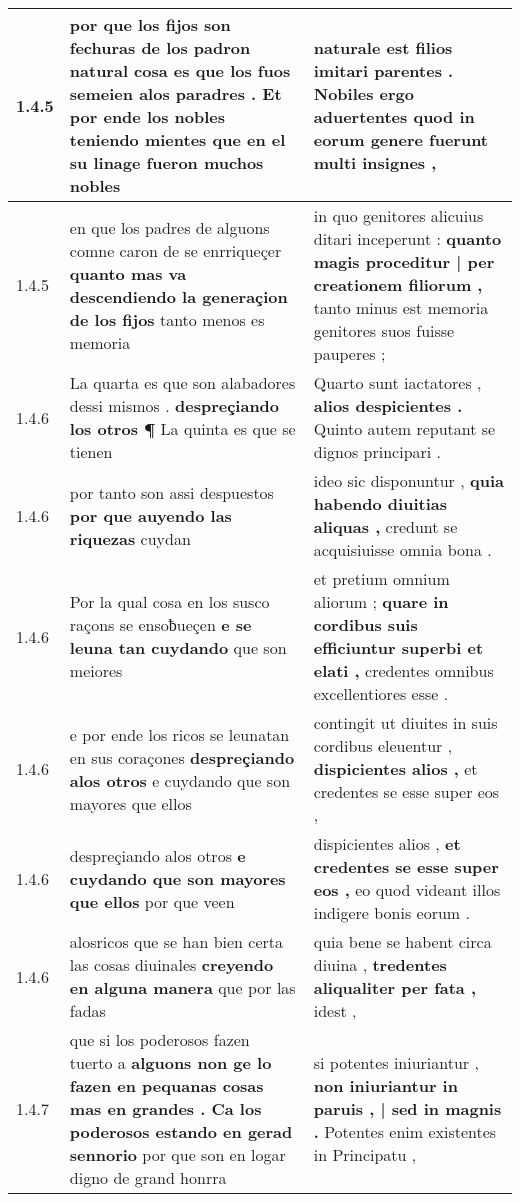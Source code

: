 \begin{tabular}{|p{1cm}|p{6.5cm}|p{6.5cm}|}
1.4.5 & por que los fijos son fechuras de los padron natural cosa es que los fuos semeien alos paradres . \textbf{ Et por ende los nobles teniendo mientes } que en el su linage fueron muchos nobles & naturale est filios imitari parentes . \textbf{ Nobiles ergo aduertentes } quod in eorum genere fuerunt multi insignes , \\\hline
1.4.5 & en que los padres de alguons comne caron de se enrriqueçer \textbf{ quanto mas va descendiendo la generaçion de los fijos } tanto menos es memoria & in quo genitores alicuius ditari inceperunt : \textbf{ quanto magis proceditur | per creationem filiorum , } tanto minus est memoria genitores suos fuisse pauperes ; \\\hline
1.4.6 & La quarta es que son alabadores dessi mismos . \textbf{ despreçiando los otros ¶ } La quinta es que se tienen & Quarto sunt iactatores , \textbf{ alios despicientes . } Quinto autem reputant se dignos principari . \\\hline
1.4.6 & por tanto son assi despuestos \textbf{ por que auyendo las riquezas } cuydan & ideo sic disponuntur , \textbf{ quia habendo diuitias aliquas , } credunt se acquisiuisse omnia bona . \\\hline
1.4.6 & Por la qual cosa en los susco raçons se ensoƀueçen \textbf{ e se leuna tan cuydando } que son meiores & et pretium omnium aliorum ; \textbf{ quare in cordibus suis efficiuntur superbi et elati , } credentes omnibus excellentiores esse . \\\hline
1.4.6 & e por ende los ricos se leunatan en sus coraçones \textbf{ despreçiando alos otros } e cuydando que son mayores que ellos & contingit ut diuites in suis cordibus eleuentur , \textbf{ dispicientes alios , } et credentes se esse super eos , \\\hline
1.4.6 & despreçiando alos otros \textbf{ e cuydando que son mayores que ellos } por que veen & dispicientes alios , \textbf{ et credentes se esse super eos , } eo quod videant illos indigere bonis eorum . \\\hline
1.4.6 & alosricos que se han bien certa las cosas diuinales \textbf{ creyendo en alguna manera } que por las fadas & quia bene se habent circa diuina , \textbf{ tredentes aliqualiter per fata , } idest , \\\hline
1.4.7 & que si los poderosos fazen tuerto a \textbf{ alguons non ge lo fazen en pequanas cosas mas en grandes . Ca los poderosos estando en gerad sennorio } por que son en logar digno de grand honrra & si potentes iniuriantur , \textbf{ non iniuriantur in paruis , | sed in magnis . } Potentes enim existentes in Principatu , \\\hline

\end{tabular}
